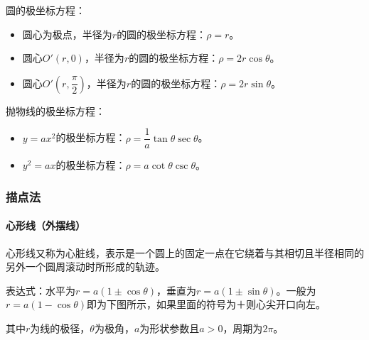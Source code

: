 圆的极坐标方程：

\begin{itemize}
    \item 圆心为极点，半径为$r$的圆的极坐标方程：$\rho=r$。
    \item 圆心$O'(r,0)$，半径为$r$的圆的极坐标方程：$\rho=2r\cos\theta$。
    \item 圆心$O'\left(r,\dfrac{\pi}{2}\right)$，半径为$r$的圆的极坐标方程：$\rho=2r\sin\theta$。
\end{itemize}

抛物线的极坐标方程：

\begin{itemize}
    \item $y=ax^2$的极坐标方程：$\rho=\dfrac{1}{a}\tan\theta\sec\theta$。
    \item $y^2=ax$的极坐标方程：$\rho=a\cot\theta\csc\theta$。
\end{itemize}

\subsubsection{描点法}
\paragraph{心形线（外摆线）} \leavevmode \medskip

\begin{minipage}{0.55\linewidth}
    心形线又称为心脏线，表示是一个圆上的固定一点在它绕着与其相切且半径相同的另外一个圆周滚动时所形成的轨迹。

    表达式：水平为$r=a(1\pm\cos\theta)$，垂直为$r=a(1\pm\sin\theta)$。一般为$r=a(1-\cos\theta)$即为下图所示，如果里面的符号为＋则心尖开口向左。

    其中$r$为线的极径，$\theta$为极角，$a$为形状参数且$a>0$，周期为$2\pi$。
\end{minipage}
\hfill
\begin{minipage}{0.35\linewidth}
\end{minipage}

